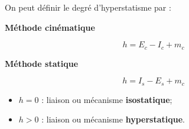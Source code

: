 \documentclass[10pt,fleqn]{article} %
\begin{document}
\begin{definition}
On peut définir le degré d'hyperstatisme par :

\vspace{-.6cm}

\begin{multicols}{2}
\begin{center}
\textbf{Méthode cinématique}
\end{center}

\vspace{-.5cm}

$$
h=E_c-I_c+m_c
$$

\begin{center}
\textbf{Méthode statique} 
\end{center}

\vspace{-.5cm}

$$
h=I_s-E_s+m_c
$$

\end{multicols}

		\begin{itemize}
			\item $h=0$ : liaison ou mécanisme \textbf{isostatique};
			\item $h>0$ : liaison ou mécanisme \textbf{hyperstatique}.
		\end{itemize}

\end{definition}
\end{document}
